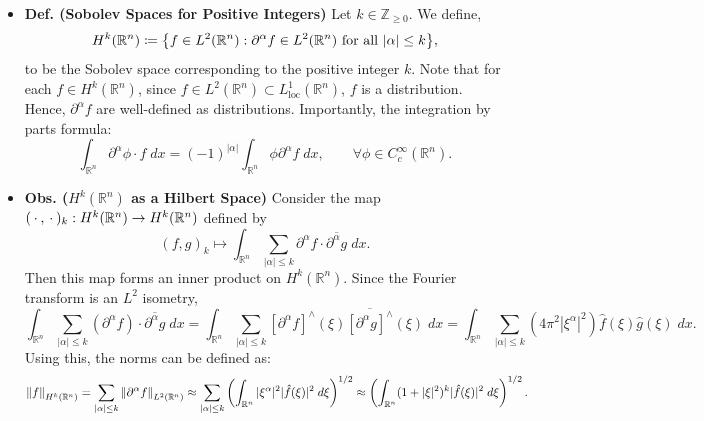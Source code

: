 \documentclass{article}
\begin{document}
\begin{itemize}
	\item \textbf{Def. (Sobolev Spaces for Positive Integers)} Let $k\in \mathbb{Z}_{\geq 0}$. We define, 
		\begin{equation}
			H^{k}(\mathbb{R}^{n}) \coloneqq \brac*{f \in L^{2}(\mathbb{R}^{n}): \partial^{\alpha}f \in L^{2}(\mathbb{R}^{n}) \text{ for all $|\alpha|\leq k$}},  
		\end{equation}
	to be the Sobolev space corresponding to the positive integer $k$. Note that for each $f \in H^{k}(\mathbb{R}^{n})$, since $f \in L^{2}(\mathbb{R}^{n}) \subset L^{1}_{\text{loc}}(\mathbb{R}^{n})$, $f$ is a distribution. Hence, $\partial^{\alpha}f$ are well-defined as distributions. Importantly, the integration by parts formula: 
		\begin{equation}
			\int_{\mathbb{R}^{n}}\partial^{\alpha}\phi \cdot f\;dx = (-1)^{|\alpha|}\int_{\mathbb{R}^{n}}\phi \partial^{\alpha}f\; dx, \qquad \forall \phi \in C_{c}^{\infty}(\mathbb{R}^{n}). 
		\end{equation} 
	
	\item \textbf{Obs. ($H^{k}(\mathbb{R}^{n})$ as a Hilbert Space)} Consider the map $(\hspace{2pt}\cdot\hspace{2pt}, \hspace{2pt}\cdot\hspace{2pt})_{k}: H^{k}(\mathbb{R}^{n}) \to H^{k}(\mathbb{R}^{n})$ defined by 
		\begin{equation}
			(f, g)_{k} \longmapsto \int_{\mathbb{R}^{n}}\sum_{|\alpha|\leq k}\partial^{\alpha}f \cdot \overline{\partial^{\alpha}g}\;dx. 
		\end{equation}
	Then this map forms an inner product on $H^{k}(\mathbb{R}^{n})$. Since the Fourier transform is an $L^{2}$ isometry, 
		\begin{equation}
			\int_{\mathbb{R}^{n}}\sum_{|\alpha|\leq k}(\partial^{\alpha}f)\cdot \overline{\partial^{\alpha}g}\;dx = \int_{\mathbb{R}^{n}}\sum_{|\alpha|\leq k}\left[\partial^{\alpha}f\right]^{\wedge}(\xi)\overline{\left[\partial^{\alpha}g\right]^{\wedge}}(\xi)\;dx = \int_{\mathbb{R}^{n}}\sum_{|\alpha|\leq k}(4\pi^{2}|\xi^{\alpha}|^{2})\hat{f}(\xi)\hat{g}(\xi)\;dx. 
		\end{equation}
	Using this, the norms can be defined as: 
		\begin{equation}
			\left\Vert f \right\Vert_{H^{k}(\mathbb{R}^{n})} = \sum_{|\alpha|\leq k}\left\Vert \partial^{\alpha}f \right\Vert_{L^{2}(\mathbb{R}^{n})} \approx \sum_{|\alpha|\leq k}\left(\int_{\mathbb{R}^{n}}|\xi^{\alpha}|^{2}|\hat{f}(\xi)|^{2}\;d\xi\right)^{1/2} \approx \left(\int_{\mathbb{R}^{n}}(1 + |\xi|^{2})^{k}|\hat{f}(\xi)|^{2}\;d\xi\right)^{1/2}. 
		\end{equation}
	

\end{itemize}
\end{document}
